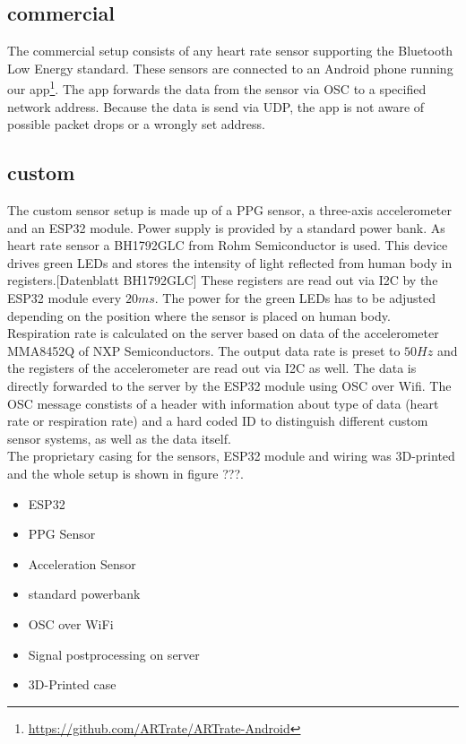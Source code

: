 \documentclass{sigchi-ext}
\begin{document}
\subsection{commercial}

The commercial setup consists of any heart rate sensor supporting the Bluetooth Low Energy
standard. These sensors are connected to an Android phone running our app\footnote{\url{https://github.com/ARTrate/ARTrate-Android}}. The app forwards the data from the sensor via OSC to a specified network address.
Because the data is send via UDP, the app is not aware of possible packet drops or a wrongly set address.

\subsection{custom}
The custom sensor setup is made up of a PPG sensor, a three-axis accelerometer and an ESP32 module. Power supply is provided by a standard power bank. As heart rate sensor a BH1792GLC from Rohm Semiconductor is used. This device drives green LEDs and stores the intensity of light reflected from human body in registers.[Datenblatt BH1792GLC] These registers are read out via I2C by the ESP32 module every $20ms$. The power for the green LEDs has to be adjusted depending on the position where the sensor is placed on human body. \\
Respiration rate is calculated on the server based on data of the accelerometer MMA8452Q of NXP Semiconductors. The output data rate is preset to $50Hz$ and the registers of the accelerometer are read out via I2C as well. The data is directly forwarded to the server by the ESP32 module using OSC over Wifi. The OSC message constists of a header with information about type of data (heart rate or respiration rate) and a hard coded ID to distinguish different custom sensor systems, as well as the data itself. \\
The proprietary casing for the sensors, ESP32 module and wiring was 3D-printed and the whole setup is shown in figure ???.

\begin{itemize}
  \item ESP32
  \item PPG Sensor
  \item Acceleration Sensor
  \item standard powerbank
  \item OSC over WiFi
  \item Signal postprocessing on server
  \item 3D-Printed case
\end{itemize}
\end{document}

